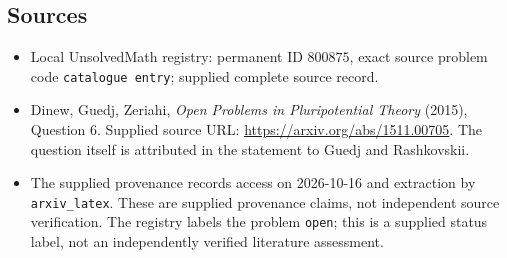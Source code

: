 \documentclass[11pt]{article}
\begin{document}
\subsection{Sources}
\begin{itemize}
\item Local UnsolvedMath registry: permanent ID \(800875\), exact source problem code \texttt{catalogue entry}; supplied complete source record.
\item Dinew, Guedj, Zeriahi, \emph{Open Problems in Pluripotential Theory} (2015), Question 6. Supplied source URL: \url{https://arxiv.org/abs/1511.00705}. The question itself is attributed in the statement to Guedj and Rashkovskii.
\item The supplied provenance records access on 2026-10-16 and extraction by \texttt{arxiv\_latex}. These are supplied provenance claims, not independent source verification. The registry labels the problem \texttt{open}; this is a supplied status label, not an independently verified literature assessment.
\end{itemize}
\end{document}
